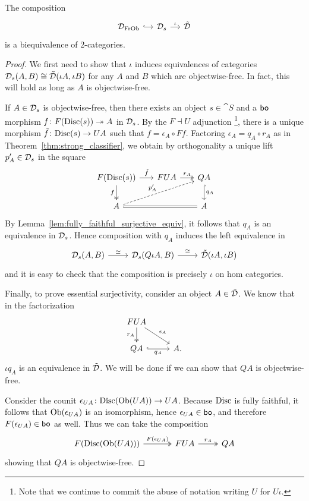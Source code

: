 \documentclass[11pt,oneside,article]{memoir}
\begin{document}
\begin{theorem}
      \label{thm:free_on_objects_strong_equivalence}
   The composition
   \[ \begin{tikzcd}[column sep=small]
      \ccatFrOb{D} \ar[r,hook]
         & \scat{D} \ar[r,"\iota"]
         & \pcat{D}
   \end{tikzcd} \]
   is a biequivalence of 2-categories.
\end{theorem}
\begin{proof}
   We first need to show that $\iota$ induces equivalences of categories
   $\mathcal{D}_s(A,B)\cong\tilde{\mathcal{D}}(\iota A,\iota B)$ for any $A$ and $B$ which are objectwise-free. In
   fact, this will hold as long as $A$ is objectwise-free.

   If $A\in\mathcal{D}_s$ is objectwise-free, then there exists an object $s\in\cat{S}$ and a $\mathsf{bo}$
   morphism $f\colon F(\mathrm{Disc}(s))\twoheadrightarrow A$ in $\mathcal{D}_s$. By the $F\dashv U$ adjunction%
   \footnote{Note that we continue to commit the abuse of notation writing $U$ for $U\iota$.},
   there is a unique morphism $\tilde{f}\colon\mathrm{Disc}(s)\to UA$ such that $f=\epsilon_A\circ Ff$.
   Factoring $\epsilon_A=q_A\circ r_A$ as in Theorem~\ref{thm:strong_classifier}, we obtain by
   orthogonality a unique lift $p'_A\in\mathcal{D}_s$ in the square
   \[ \begin{tikzcd}[column sep=1.7em]
      F(\Disc(s)) \ar[d,two heads,"f"'] \ar[r,"\tilde{f}"]
         & FUA \ar[r,two heads,"r_A"]
         & QA \ar[d,hook,"q_A"] \\
      A \ar[urr,dashed,"p'_A"] \ar[rr,equal] && A
   \end{tikzcd} \]
   By Lemma~\ref{lem:fully_faithful_surjective_equiv}, it follows that $q_A$ is an equivalence in
   $\mathcal{D}_s$. Hence composition with $q_A$ induces the left equivalence in
   \[ \begin{tikzcd}
      \scat{D}(A,B) \ar[r,"\equiv"]
         & \scat{D}(Q\iota A,B) \ar[r,"\iso"]
         & \pcat{D}(\iota A,\iota B)
   \end{tikzcd} \]
   and it is easy to check that the composition is precisely $\iota$ on hom categories.

   Finally, to prove essential surjectivity, consider an object $A\in\tilde{\mathcal{D}}$. We know that in the
   factorization
   \[ \begin{tikzcd}
      FUA \ar[dr,"\epsilon_A"] \ar[d,two heads,"r_A"'] & \\
      QA \ar[r,hook,"q_A"'] & A.
   \end{tikzcd} \]
   $\iota q_A$ is an equivalence in $\tilde{\mathcal{D}}$. We will be done if we can show that $QA$ is
   objectwise-free.

   Consider the counit $\epsilon_{UA}\colon\mathrm{Disc}(\mathrm{Ob}(UA))\to UA$. Because $\mathrm{Disc}$ is fully faithful,
   it follows that $\mathrm{Ob}(\epsilon_{UA})$ is an isomorphism, hence $\epsilon_{UA}\in\mathsf{bo}$, and
   therefore $F(\epsilon_{UA})\in\mathsf{bo}$ as well. Thus we can take the composition
   \[ \begin{tikzcd}
      F(\Disc(\Ob(UA))) \ar[r,two heads,"F(\epsilon_{UA})"]
         &[1em] FUA \ar[r,two heads,"r_A"]
         & QA
   \end{tikzcd} \]
   showing that $QA$ is objectwise-free.
\end{proof}
\end{document}
